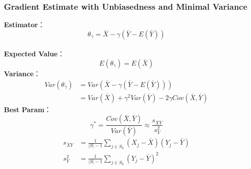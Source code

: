 \documentclass{beamer}
\begin{document}
\begin{frame}
	\frametitle{\bf Gradient Estimate with Unbiasedness and Minimal Variance} 
	\textbf { Estimator}：$$\theta_{\gamma}=\bar{X}-\gamma(\bar{Y}-E(\bar{Y}))$$ \\
	\textbf { Expected Value}：$$E(\theta_{\gamma})=E(\bar{X})$$
	\textbf { Variance}：\begin{equation}
		\begin{aligned}
			Var(\theta_{\gamma}) & =Var(\bar{X}-\gamma(\bar{Y}-E(\bar{Y})))\\
			& =Var(\bar{X})+\gamma^2 Var(\bar{Y})-2 \gamma Cov(\bar{X},\bar{Y})
			\label{2:variance}
		\end{aligned}
	\end{equation}
	\textbf { Best Param}：
\begin{equation}
		\gamma^*=\frac{Cov(\bar{X}, \bar{Y})}{Var(\bar{Y})}\approx \frac{s_{XY}}{s_Y^2}
			\label{3:gamma_star}
\end{equation}
\begin{equation}
	\begin{aligned}
		s_{XY}&=\frac{1}{|S|-1}\sum_{j\in S_k}(X_j-\bar{X})(Y_j-\bar{Y})\\
		s_{Y}^2&=\frac{1}{|S|-1}\sum_{j\in S_k}(Y_j-\bar{Y})^2
		\label{2:sample_variance_1}
	\end{aligned}
\end{equation}

\end{frame}
\end{document}
